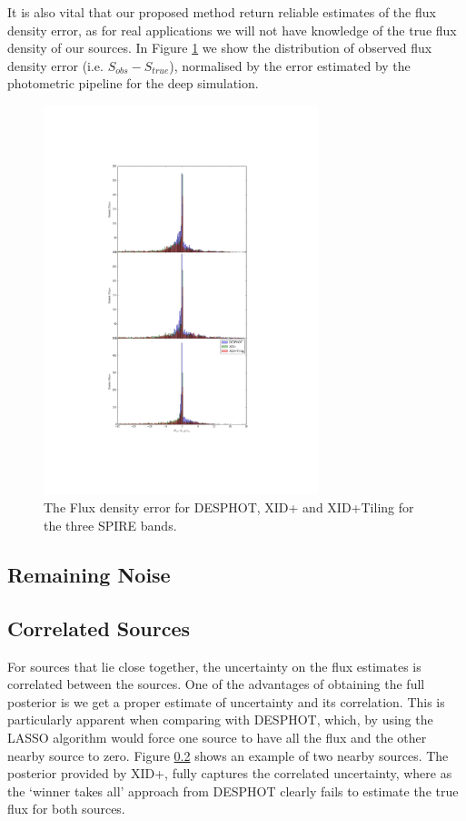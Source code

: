 \documentclass[useAMS,usenatbib]{mn2e}
\begin{document}
It is also vital that our proposed method return reliable estimates of the flux density error, as for real applications we will not have knowledge of the true flux density of our sources. In Figure \ref{Fig:flux_density_error} we show the distribution of observed flux density error (i.e. $S_{obs}-S_{true}$), normalised by the error estimated by the photometric pipeline for the deep simulation. 

\begin{figure}
\includegraphics[width=8cm]{./Figures/Flux_density_error}
\caption{The Flux density error for DESPHOT, XID+ and XID+Tiling for the three SPIRE bands.}\label{Fig:flux_density_error}
\end{figure}


\subsection{Remaining Noise}
 
\subsection{Correlated Sources}
For sources that lie close together, the uncertainty on the flux estimates is correlated between the sources. One of the advantages of obtaining the full posterior is we get a proper estimate of uncertainty and its correlation. This is particularly apparent when comparing with DESPHOT, which, by using the LASSO algorithm would force one source to have all the flux and the other nearby source to zero. Figure \ref{} shows an example of two nearby sources. The posterior provided by XID+, fully captures the correlated uncertainty, where as the `winner takes all' approach from DESPHOT clearly fails to estimate the true flux for both sources.
\end{document}
